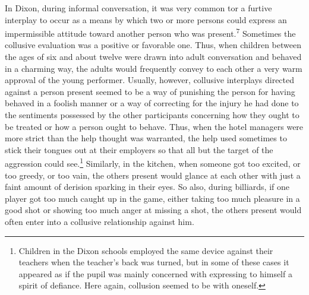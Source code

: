 \documentclass[openany,nobib]{tufte-book}
\begin{document}
\noindent In Dixon, during informal conversation, it was very common tor a furtive
interplay to occur as a means by which two or more persons could express
an impermissible attitude toward another person who was
present.\textsuperscript{7} Sometimes the collusive evaluation was a
positive or favorable one. Thus, when children between the ages of six
and about twelve were drawn into adult conversation and behaved in a
charming way, the adults would frequently convey to each other a very
warm approval of the young performer. Usually, however, collusive
interplays directed against a person present seemed to be a way of
punishing the person for having behaved in a foolish manner or a way of
correcting for the injury he had done to the sentiments possessed by the
other participants concerning how they ought to be treated or how a
person ought to behave. Thus, when the hotel managers were more strict
than the help thought was warranted, the help used sometimes to stick
their tongues out at their employers so that all but the target of the
aggression could see.\footnote{Children in the Dixon schools employed
  the same device against their teachers when the teacher's back was
  turned, but in some of these cases it appeared as if the pupil was
  mainly concerned with expressing to himself a spirit of defiance. Here
  again, collusion seemed to be with oneself.} Similarly, in the
kitchen, when someone got too excited, or too greedy, or too vain, the
others present would glance at each other with just a faint amount of
derision sparking in their eyes. So also, during billiards, if one
player got too much caught up in the game, either taking too much
pleasure in a good shot or showing too much anger at missing a shot, the
others present would often enter into a collusive relationship against
him.
\end{document}
